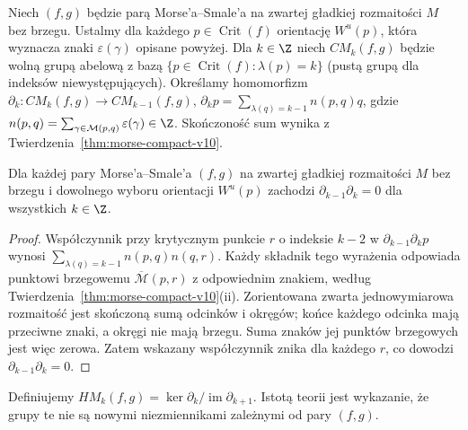 \begin{definicja}
\label{def:morse-complex-v10}
Niech $(f,g)$ będzie parą Morse'a--Smale'a na
zwartej gładkiej rozmaitości $M$ bez brzegu.
Ustalmy dla każdego $p\in\operatorname{Crit}(f)$
orientację $W^u(p)$, która wyznacza znaki
$\varepsilon(\gamma)$ opisane powyżej.
Dla $k\in\Z$ niech $CM_k(f,g)$ będzie wolną grupą
abelową z bazą
$\{p\in\operatorname{Crit}(f):\lambda(p)=k\}$
(pustą grupą dla indeksów niewystępujących).
Określamy homomorfizm $\partial_k:CM_k(f,g)\to CM_{k-1}(f,g)$,
$\partial_kp=\sum_{\lambda(q)=k-1}n(p,q)q$, gdzie
$n(p,q)=\sum_{\gamma\in\mathcal M(p,q)}\varepsilon(\gamma)\in\Z$.
Skończoność sum wynika z Twierdzenia~\ref{thm:morse-compact-v10}.
\end{definicja}

\begin{twierdzenie}[Różniczka Morse'a spełnia $\partial^2=0$]
\label{thm:morse-d2-v10}
Dla każdej pary Morse'a--Smale'a $(f,g)$ na zwartej gładkiej
rozmaitości $M$ bez brzegu i dowolnego wyboru
orientacji $W^u(p)$ zachodzi
$\partial_{k-1}\partial_k=0$ dla wszystkich $k\in\Z$.
\end{twierdzenie}
\begin{proof}
Współczynnik przy krytycznym punkcie $r$ o indeksie $k-2$
w $\partial_{k-1}\partial_kp$ wynosi
$\sum_{\lambda(q)=k-1}n(p,q)n(q,r)$.
Każdy składnik tego wyrażenia odpowiada punktowi brzegowemu
$\overline{\mathcal M}(p,r)$ z odpowiednim znakiem, według
Twierdzenia~\ref{thm:morse-compact-v10}(ii). Zorientowana
zwarta jednowymiarowa rozmaitość jest skończoną sumą odcinków
i okręgów; końce każdego odcinka mają przeciwne znaki,
a okręgi nie mają brzegu. Suma znaków jej punktów brzegowych
jest więc zerowa. Zatem wskazany współczynnik znika dla
każdego $r$, co dowodzi $\partial_{k-1}\partial_k=0$.
\end{proof}

Definiujemy $HM_k(f,g)=\ker\partial_k/\operatorname{im}\partial_{k+1}$.
Istotą teorii jest wykazanie, że grupy te nie są nowymi
niezmiennikami zależnymi od pary $(f,g)$.

